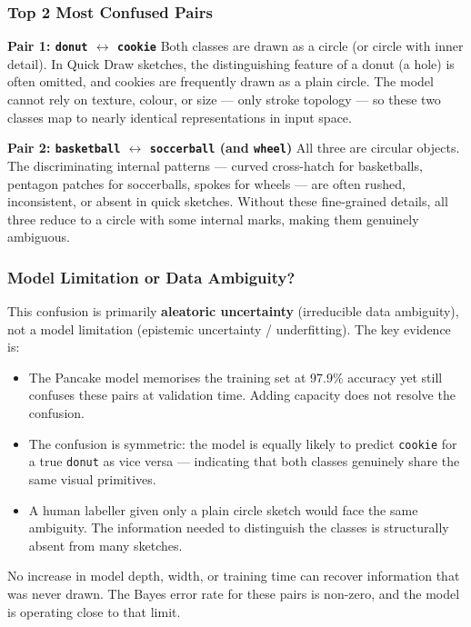 \documentclass[11pt,a4paper]{article}
\begin{document}
\subsubsection*{Top 2 Most Confused Pairs}

\textbf{Pair 1: \texttt{donut} $\leftrightarrow$ \texttt{cookie}}
Both classes are drawn as a circle (or circle with inner detail). In Quick Draw sketches, the distinguishing feature of a donut (a hole) is often omitted, and cookies are frequently drawn as a plain circle. The model cannot rely on texture, colour, or size — only stroke topology — so these two classes map to nearly identical representations in input space.

\textbf{Pair 2: \texttt{basketball} $\leftrightarrow$ \texttt{soccerball} (and \texttt{wheel})}
All three are circular objects. The discriminating internal patterns — curved cross-hatch for basketballs, pentagon patches for soccerballs, spokes for wheels — are often rushed, inconsistent, or absent in quick sketches. Without these fine-grained details, all three reduce to a circle with some internal marks, making them genuinely ambiguous.

\subsubsection*{Model Limitation or Data Ambiguity?}

This confusion is primarily \textbf{aleatoric uncertainty} (irreducible data ambiguity), not a model limitation (epistemic uncertainty / underfitting). The key evidence is:

\begin{itemize}[noitemsep]
    \item The Pancake model memorises the training set at 97.9\% accuracy yet still confuses these pairs at validation time. Adding capacity does not resolve the confusion.
    \item The confusion is symmetric: the model is equally likely to predict \texttt{cookie} for a true \texttt{donut} as vice versa — indicating that both classes genuinely share the same visual primitives.
    \item A human labeller given only a plain circle sketch would face the same ambiguity. The information needed to distinguish the classes is structurally absent from many sketches.
\end{itemize}

No increase in model depth, width, or training time can recover information that was never drawn. The Bayes error rate for these pairs is non-zero, and the model is operating close to that limit.
\end{document}
